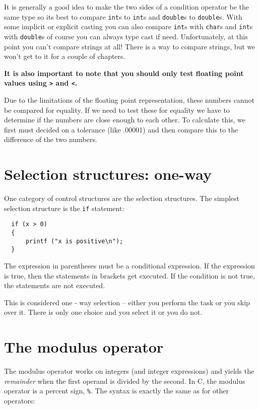 It is generally a good idea to make the two sides of a condition operator be the same
type so its best to compare {\tt int}s to {\tt int}s and {\tt double}s to {\tt double}s. With some implicit or explicit casting
you can also compare {\tt int}s with {\tt char}s and {\tt int}s with {\tt double}s of course you can always type cast if need.  
 Unfortunately, at this
point you can't compare strings at all!  There is
a way to compare strings, but we won't get to it for a couple
of chapters.

{\bf It is also important to note that you should only test floating point values using {\tt >} and {\tt <}.}

Due to the limitations of the floating point representation, these numbers cannot be compared for equality. 
If we need to test these for equality we have to determine if the numbers are close enough to each other. 
To calculate this, we first must decided on a tolerance (like .00001) and then compare  this to the difference of the two numbers.


\section{Selection structures: one-way} 

One category of control structures are the selection structures. The simplest selection structure is the {\tt if} statement:

\begin{verbatim}
  if (x > 0) 
  {
      printf ("x is positive\n");
  }
\end{verbatim}
%

The expression in parentheses must be a conditional expression.
If the expression is true, then the statements in brackets get executed.
If the condition is not true, the statements are not executed. 


This is considered one - way selection -- either you perform the task or you skip over it. 
There is only one choice and you select it or you do not.

\section{The modulus operator}

The modulus operator works on integers (and integer expressions)
and yields the {\em remainder} when the first operand is divided
by the second.  In C, the modulus operator is a percent sign,
{\tt \%}.  The syntax is exactly the same as for other operators:

